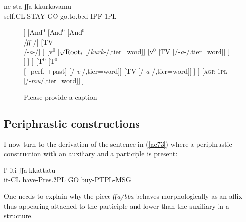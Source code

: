 \documentclass[output=paper]{langscibook}
\begin{document}
\ea \label{ac71}
    \gll ne     sta    ʃʃa  kkurkavamu\\
   self.CL STAY GO  go.to.bed-IPF-1PL\\
\z

\begin{figure}
  \caption{\label{ac72}\color{red}Please provide a caption}
  \begin{forest}
  	[T$^0$
  		[T$^0$
	  		[$\surd{} + \text{prog}$
	  			[$\surd{} + \text{prog}$
	  				[$\surd{} + \text{prog}$\\/\textit{st}-/]
	  				[TV\\/-\textit{a}-/]
	  			]
	  			[And$^0$
	  				[And$^0$
	  					[And$^0$\\/\textit{ʃʃ}-/]
	  					[TV\\/-\textit{a}-/]
	  				]
	  				[v$^0$
	  					[$\surd\text{Root}_i$ [/\textit{kurk}-/,tier=word]]
	  					[v$^0$
	  						[TV [/-\textit{a}-/,tier=word]]
	  					]
	  				]
	  			]
	  		]
	  		[T$^0$
	  			[T$^0$\\{[−perf, +past]} [/-\textit{v}-/,tier=word]]
	  			[TV [/-\textit{a}-/,tier=word]]
	  		]
  		]
  		[\textsc{agr 1pl} [/-\textit{mu}/,tier=word]]
  	]
  \end{forest}
\end{figure}

\subsection{Periphrastic constructions}

I now turn to the derivation of the sentence in (\ref{ac73}) where a periphrastic construction with an auxiliary and a participle is present:

\ea\label{ac73}
\gll l’    iti         ʃʃa   kkattatu\\
   it-CL  have-Pres.2PL    GO  buy-PTPL-MSG\\
\z

One needs to explain why the piece \textit{ʃʃa/bba} behaves morphologically as an affix thus appearing attached  to the participle and lower than the auxiliary in a structure.
\end{document}
